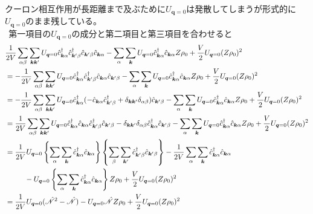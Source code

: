 \documentclass[dvipdfmx, 11pt, a4paper]{jsarticle}
\theoremstyle{definition}
\numberwithin{equation}{section}
\begin{document}
    クーロン相互作用が長距離まで及ぶために$U_{\bm{q}=0}$は発散してしまうが形式的に$U_{\bm{q}=0}$のまま残している。\\
    $\ \ $第一項目の$U_{\bm{q}=0}$の成分と第二項目と第三項目を合わせると
    \begin{align}
        &\frac{1}{2V}\sum_{\alpha \beta}\sum_{\bm{k}\bm{k}'} U_{\bm{q}=0} \hat{c}^\dagger_{\bm{k}\alpha} \hat{c}^\dagger_{\bm{k}' \beta} \hat{c}_{\bm{k}'\beta} \hat{c}_{\bm{k}\alpha}-\sum_{\alpha}\sum_{\bm{k}} U_{\bm{q}=0}\hat{c}^\dagger_{\bm{k}\alpha}\hat{c}_{\bm{k}\alpha}Z\rho_0 + \frac{V}{2}U_{\bm{q}=0}(Z\rho_0)^2 \notag \\
        &=-\frac{1}{2V}\sum_{\alpha \beta}\sum_{\bm{k}\bm{k}'} U_{\bm{q}=0} \hat{c}^\dagger_{\bm{k}\alpha} \hat{c}^\dagger_{\bm{k}' \beta} \hat{c}_{\bm{k}\alpha}\hat{c}_{\bm{k}'\beta} -\sum_{\alpha}\sum_{\bm{k}} U_{\bm{q}=0}\hat{c}^\dagger_{\bm{k}\alpha}\hat{c}_{\bm{k}\alpha}Z\rho_0 + \frac{V}{2}U_{\bm{q}=0}(Z\rho_0)^2 \notag \\
        &=-\frac{1}{2V}\sum_{\alpha \beta}\sum_{\bm{k}\bm{k}'} U_{\bm{q}=0} \hat{c}^\dagger_{\bm{k}\alpha}( -\hat{c}_{\bm{k}\alpha}\hat{c}^\dagger_{\bm{k}' \beta} + \delta_{\bm{k}\bm{k}'} \delta_{\alpha \beta} )\hat{c}_{\bm{k}'\beta} -\sum_{\alpha}\sum_{\bm{k}} U_{\bm{q}=0}\hat{c}^\dagger_{\bm{k}\alpha}\hat{c}_{\bm{k}\alpha}Z\rho_0 + \frac{V}{2}U_{\bm{q}=0}(Z\rho_0)^2 \notag \\
        &=\frac{1}{2V}\sum_{\alpha \beta}\sum_{\bm{k}\bm{k}'} U_{\bm{q}=0} \hat{c}^\dagger_{\bm{k}\alpha}\hat{c}_{\bm{k}\alpha}\hat{c}^\dagger_{\bm{k}' \beta}\hat{c}_{\bm{k}'\beta} - \delta_{\bm{k}\bm{k}'} \delta_{\alpha \beta} \hat{c}^\dagger_{\bm{k}\alpha}\hat{c}_{\bm{k}'\beta} -\sum_{\alpha}\sum_{\bm{k}} U_{\bm{q}=0}\hat{c}^\dagger_{\bm{k}\alpha}\hat{c}_{\bm{k}\alpha}Z\rho_0 + \frac{V}{2}U_{\bm{q}=0}(Z\rho_0)^2 \notag \\
        &=\frac{1}{2V} U_{\bm{q}=0} \left\{ \sum_\alpha \sum_{\bm{k}} \hat{c}^\dagger_{\bm{k}\alpha}\hat{c}_{\bm{k}\alpha} \right\}\left\{ \sum_\beta \sum_{\bm{k}'} \hat{c}^\dagger_{\bm{k}'\beta}\hat{c}_{\bm{k}'\beta} \right\} - \frac{1}{2V} \sum_\alpha \sum_{\bm{k}} \hat{c}^\dagger_{\bm{k}\alpha}\hat{c}_{\bm{k}\alpha} \notag \\
        &\ \ \ \ \ \ \ \ -U_{\bm{q}=0}\left\{ \sum_{\alpha}\sum_{\bm{k}} \hat{c}^\dagger_{\bm{k}\alpha}\hat{c}_{\bm{k}\alpha} \right\}Z\rho_0 + \frac{V}{2}U_{\bm{q}=0}(Z\rho_0)^2 \notag  \\
        &=\frac{1}{2V} U_{\bm{q}=0} (\hat{\mathscr{N}}^2-\hat{\mathscr{N}}) - U_{\bm{q}=0}\hat{\mathscr{N}}Z\rho_0 + \frac{V}{2}U_{\bm{q}=0}(Z\rho_0)^2  
    \end{align}
\end{document}
